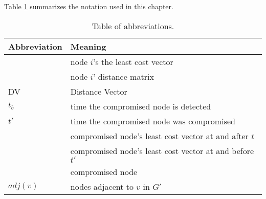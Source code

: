 Table \ref{tab:abbrev} summarizes the notation used in this chapter. 

\begin{table}[t]
\begin{center}
\begin{tabular}{l l} 
\hline \hline
   	{\bf Abbreviation} & {\bf Meaning} \\
		  \hline 
			\minvi & node $i$'s the least cost vector \\
			\dmatrixi & node $i$' distance matrix \\
			DV & Distance Vector \\
			\hline
			$t_b$ & time the compromised node is detected \\
			$t'$ & time the compromised node was compromised \\
			\badvector & compromised node's least cost vector at and after $t$  \\
			\oldvector & compromised node's least cost vector at and before $t'$ \\
			\bad & compromised node \\ 
			$adj(v)$ & nodes adjacent to $v$ in $G'$ \\ 
			\hline \hline
			\end{tabular}
			\end{center}
\caption{Table of abbreviations.} 
\label{tab:abbrev}
\end{table}
